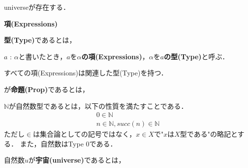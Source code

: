 %




%
\begin{definition}
    universeが存在する．
\end{definition}

\begin{definition}
    \textbf{項(Expressions)}
\end{definition}

\begin{definition}
    \textbf{型(Type)}であるとは，
\end{definition}

\begin{definition}
    $a$ : $\alpha$と書いたとき，$a$を\textbf{$\alpha$の項(Expressions)}，$\alpha$を\textbf{$a$の型(Type)}と呼ぶ．
\end{definition}

\begin{theorem}[関数型言語より]
    すべての項(Expressions)は関連した型(Type)を持つ．
\end{theorem}

\begin{definition}
    が\textbf{命題(Prop)}であるとは，
\end{definition}

\begin{definition}
    $\mathbb{N}$が自然数型であるとは，以下の性質を満たすことである．
    \begin{align}
        0 \in \mathbb{N}\\
        n\in\mathbb{N},succ(n)\in \mathbb{N}
    \end{align}
    ただし$\in$は集合論としての記号ではなく，$x\in X$で"$x$は$X$型である"の略記とする．
    また，自然数はType 0である．
\end{definition}

\begin{definition}
    自然数$u$が\textbf{宇宙(universe)}であるとは，
\end{definition}

